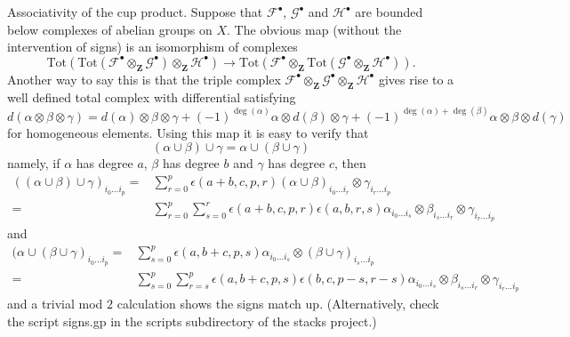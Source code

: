 \medskip\noindent
Associativity of the cup product. Suppose that ${\mathcal F}^\bullet$,
${\mathcal G}^\bullet$ and ${\mathcal H}^\bullet$ are bounded below
complexes of abelian groups on $X$. The obvious map
(without the intervention of signs) is an isomorphism
of complexes
$$
\text{Tot}(
\text{Tot}({\mathcal F}^\bullet \otimes_{\mathbf Z} {\mathcal G}^\bullet)
\otimes_{\mathbf Z} {\mathcal H}^\bullet
)
\longrightarrow
\text{Tot}(
{\mathcal F}^\bullet \otimes_{\mathbf Z}
\text{Tot}({\mathcal G}^\bullet \otimes_{\mathbf Z} {\mathcal H}^\bullet)
).
$$
Another way to say this is that the triple complex
${\mathcal F}^\bullet \otimes_{\mathbf Z} {\mathcal G}^\bullet
\otimes_{\mathbf Z} {\mathcal H}^\bullet$ gives rise to a well defined
total complex with differential satisfying
$$
d(\alpha \otimes \beta \otimes \gamma) =
d(\alpha) \otimes \beta \otimes \gamma +
(-1)^{\deg(\alpha)} \alpha \otimes d(\beta) \otimes \gamma +
(-1)^{\deg(\alpha) + \deg(\beta)} \alpha \otimes \beta \otimes d(\gamma)
$$
for homogeneous elements. Using this map it is easy to verify that
$$
(\alpha \cup \beta) \cup \gamma = \alpha \cup ( \beta \cup \gamma)
$$
namely, if $\alpha$ has degree $a$, $\beta$ has degree $b$ and
$\gamma$ has degree $c$, then
\begin{align*}
((\alpha \cup \beta) \cup \gamma)_{i_0 \ldots i_p}
= &
\sum\nolimits_{r = 0}^p
\epsilon(a + b, c, p, r)
(\alpha \cup \beta)_{i_0 \ldots i_r} \otimes \gamma_{i_r \ldots i_p}
\\
= &
\sum\nolimits_{r = 0}^p
\sum\nolimits_{s = 0}^r
\epsilon(a + b, c, p, r) \epsilon(a, b, r, s)
\alpha_{i_0 \ldots i_s} \otimes
\beta_{i_s \ldots i_r} \otimes
\gamma_{i_r \ldots i_p}
\end{align*}
and
\begin{align*}
(\alpha \cup (\beta \cup \gamma)_{i_0\ldots i_p}
= &
\sum\nolimits_{s = 0}^p
\epsilon(a, b + c, p, s)
\alpha_{i_0 \ldots i_s} \otimes (\beta \cup \gamma)_{i_s \ldots i_p}
\\
= &
\sum\nolimits_{s = 0}^p
\sum\nolimits_{r = s}^p
\epsilon(a, b + c, p, s) \epsilon(b, c, p - s, r - s)
\alpha_{i_0 \ldots i_s} \otimes \beta_{i_s \ldots i_r} \otimes
\gamma_{i_r \ldots i_p}
\end{align*}
and a trivial mod $2$ calculation shows the signs match up.
(Alternatively, check the script signs.gp in the scripts subdirectory
of the stacks project.)

